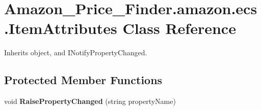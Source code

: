 \hypertarget{class_amazon___price___finder_1_1amazon_1_1ecs_1_1_item_attributes}{\section{Amazon\-\_\-\-Price\-\_\-\-Finder.\-amazon.\-ecs.\-Item\-Attributes Class Reference}
\label{class_amazon___price___finder_1_1amazon_1_1ecs_1_1_item_attributes}
}


 




Inherits object, and I\-Notify\-Property\-Changed.

\subsection*{Protected Member Functions}
\begin{DoxyCompactItemize}
\item 
\hypertarget{class_amazon___price___finder_1_1amazon_1_1ecs_1_1_item_attributes_a30fffd516eee6933567cd47a4dc7f538}{void {\bfseries Raise\-Property\-Changed} (string property\-Name)}\label{class_amazon___price___finder_1_1amazon_1_1ecs_1_1_item_attributes_a30fffd516eee6933567cd47a4dc7f538}

\end{DoxyCompactItemize}
